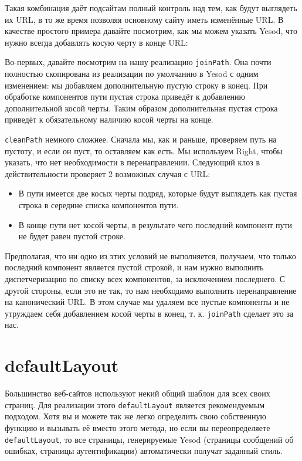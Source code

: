 Такая комбинация даёт подсайтам полный контроль над тем, как будут выглядеть их URL, в то же время позволяя основному сайту иметь изменённые URL. В качестве простого примера давайте посмотрим, как мы можем указать Yesod, что нужно всегда добавлять косую черту в конце URL:

Во-первых, давайте посмотрим на нашу реализацию \lstinline!joinPath!. Она почти полностью скопирована из реализации по умолчанию в Yesod с одним изменением: мы добавляем дополнительную пустую строку в конец. При обработке компонентов пути пустая строка приведёт к добавлению дополнительной косой черты. Таким образом дополнительная пустая строка приведёт к обязательному наличию косой черты на конце.

\lstinline!cleanPath! немного сложнее. Сначала мы, как и раньше, проверяем путь на пустоту, и если он пуст, то оставляем как есть. Мы используем Right, чтобы указать, что нет необходимости в перенаправлении. Следующий клоз в действительности проверяет 2 возможных случая с URL:

\begin{itemize}
  \item В пути имеется две косых черты подряд, которые будут выглядеть как пустая строка в середине списка компонентов пути.
  \item В конце пути нет косой черты, в результате чего последний компонент пути не будет равен пустой строке.
\end{itemize}

Предполагая, что ни одно из этих условий не выполняется, получаем, что только последний компонент является пустой строкой, и нам нужно выполнить диспетчеризацию по списку всех компонентов, за исключением последнего. С другой стороны, если это не так, то нам необходимо выполнить перенаправление на канонический URL. В этом случае мы удаляем все пустые компоненты и не утруждаем себя добавлением косой черты в конец, т. к. \lstinline!joinPath! сделает это за нас.

\section {defaultLayout}

Большинство веб-сайтов используют некий общий шаблон для всех своих страниц. Для реализации этого \lstinline!defaultLayout! является рекомендуемым подходом. Хотя вы и можете так же легко определить свою собственную функцию и вызывать её вместо этого метода, но если вы переопределяете \lstinline!defaultLayout!, то все страницы, генерируемые Yesod (страницы сообщений об ошибках, страницы аутентификации) автоматически получат заданный стиль.

